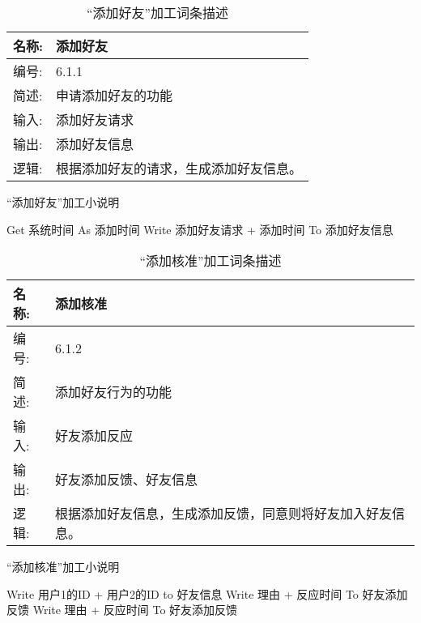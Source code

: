 \begin{table}[H]  
\caption{“添加好友”加工词条描述}  
\begin{center}  
    \begin{tabular}{l p{11cm}} 
        \hline
        \quad 名称:  &  添加好友 \\
        \hline
        \quad 编号:  & 6.1.1 \\
        \hline
        \quad 简述:  & 申请添加好友的功能 \\
        \hline
        \quad 输入:  & 添加好友请求\\
        \hline
        \quad 输出:  & 添加好友信息 \\
        \hline
        \quad 逻辑:  & 根据添加好友的请求，生成添加好友信息。 \\
        \hline
    \end{tabular}
    \label{tab1}
\end{center}
\end{table}

\begin{algorithm}[H]
    \renewcommand{\thealgorithm}{}
    \caption{“添加好友”加工小说明} 
    \label{alg3} 
    \begin{algorithmic}[1]
        \STATE Get 系统时间 As 添加时间
        \STATE Write 添加好友请求 + 添加时间 To 添加好友信息
    \end{algorithmic} 
\end{algorithm}

\begin{table}[H]  
\caption{“添加核准”加工词条描述}  
\begin{center}  
    \begin{tabular}{l p{11cm}} 
        \hline
        \quad 名称:  &   添加核准 \\
        \hline
        \quad 编号:  & 6.1.2 \\
        \hline
        \quad 简述:  & 添加好友行为的功能 \\
        \hline
        \quad 输入:  & 好友添加反应\\
        \hline
        \quad 输出:  & 好友添加反馈、好友信息 \\
        \hline
        \quad 逻辑:  & 根据添加好友信息，生成添加反馈，同意则将好友加入好友信息。 \\
        \hline
    \end{tabular}
    \label{tab1}
\end{center}
\end{table}

\begin{algorithm}[H]
    \renewcommand{\thealgorithm}{}
    \caption{“添加核准”加工小说明} 
    \label{alg3} 
    \begin{algorithmic}[1]
        \STATE Write 用户1的ID + 用户2的ID to 好友信息 
        \STATE Write {理由} + 反应时间  To 好友添加反馈
        \ELSE
        \STATE Write {理由} + 反应时间  To 好友添加反馈
        \ENDIF 
    \end{algorithmic} 
\end{algorithm}

